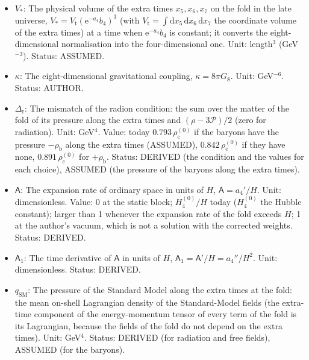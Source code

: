 \documentclass[
  10pt,
]{article}
\begin{document}
\begin{itemize}
  \(\Lambda = -7H^2\) (the author's original value \(-10H^2\) was
  corrected on 2026-10-25); in UM-3 a free parameter. Unit: GeV
  (1/length). Status: AUTHOR.
\item
  \(V_*\): The physical volume of the extra times \(x_5, x_6, x_7\) on
  the fold in the late universe,
  \(V_* = V_{\mathrm{t}}(\mathrm{e}^{-a_4}b_4)^3\) (with
  \(V_{\mathrm{t}} = \int\mathrm{d}x_5\,\mathrm{d}x_6\,\mathrm{d}x_7\)
  the coordinate volume of the extra times) at a time when
  \(\mathrm{e}^{-a_4}b_4\) is constant; it converts the
  eight-dimensional normalisation into the four-dimensional one. Unit:
  length\(^3\) (GeV\(^{-3}\)). Status: ASSUMED.
\item
  \(\kappa\): The eight-dimensional gravitational coupling,
  \(\kappa = 8\pi G_8\). Unit: GeV\(^{-6}\). Status: AUTHOR.
\item
  \(\Delta_{\mathrm{r}}\): The mismatch of the radion condition: the sum
  over the matter of the fold of its pressure along the extra times and
  \((\rho - 3\mathcal{P})/2\) (zero for radiation). Unit: GeV\(^4\).
  Value: today \(0.793\,\rho_{\mathrm{c}}^{(0)}\) if the baryons have
  the pressure \(-\rho_{\mathrm{b}}\) along the extra times (ASSUMED),
  \(0.842\,\rho_{\mathrm{c}}^{(0)}\) if they have none,
  \(0.891\,\rho_{\mathrm{c}}^{(0)}\) for \(+\rho_{\mathrm{b}}\). Status:
  DERIVED (the condition and the values for each choice), ASSUMED (the
  pressure of the baryons along the extra times).
\item
  \(\mathsf{A}\): The expansion rate of ordinary space in units of
  \(H\), \(\mathsf{A} = a_4'/H\). Unit: dimensionless. Value: 0 at the
  static block; \(H_4^{(0)}/H\) today (\(H_4^{(0)}\) the Hubble
  constant); larger than 1 whenever the expansion rate of the fold
  exceeds \(H\); 1 at the author's vacuum, which is not a solution with
  the corrected weights. Status: DERIVED.
\item
  \(\mathsf{A}_1\): The time derivative of \(\mathsf{A}\) in units of
  \(H\), \(\mathsf{A}_1 = \mathsf{A}'/H = a_4''/H^2\). Unit:
  dimensionless. Status: DERIVED.
\item
  \(q_{\mathrm{SM}}\): The pressure of the Standard Model along the
  extra times at the fold: the mean on-shell Lagrangian density of the
  Standard-Model fields (the extra-time component of the energy-momentum
  tensor of every term of the fold is its Lagrangian, because the fields
  of the fold do not depend on the extra times). Unit: GeV\(^4\).
  Status: DERIVED (for radiation and free fields), ASSUMED (for the
  baryons).

\end{itemize}
\end{document}
